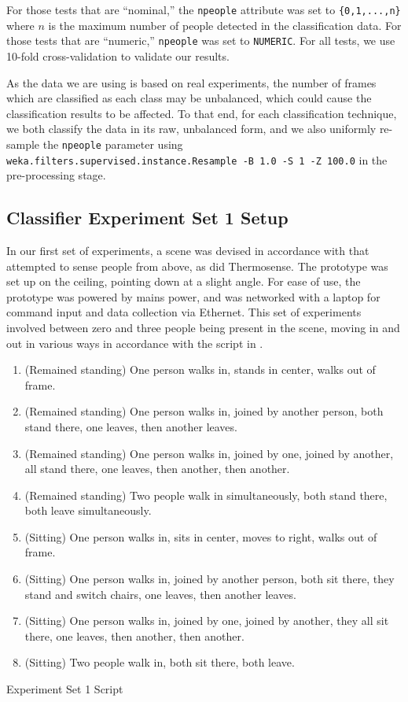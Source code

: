 \documentclass[../thesis/thesis.tex]{subfiles}
\begin{document}
For those tests that are ``nominal,'' the \texttt{npeople} attribute was set to \texttt{\{0,1,...,n\}} where $n$ is the maximum number of people detected in the classification data. For those tests that are ``numeric,'' \texttt{npeople} was set to \texttt{NUMERIC}. For all tests, we use 10-fold cross-validation to validate our results.

As the data we are using is based on real experiments, the number of frames which are classified as each class may be unbalanced, which could cause the classification results to be affected. To that end, for each classification technique, we both classify the data in its raw, unbalanced form, and we also uniformly re-sample the \texttt{npeople} parameter using \texttt{weka.filters.supervised.instance.Resample -B 1.0 -S 1 -Z 100.0} in the pre-processing stage.


\subsection{Classifier Experiment Set 1 Setup}
In our first set of experiments, a scene was devised in accordance with  that attempted to sense people from above, as did Thermosense. The prototype was set up on the ceiling, pointing down at a slight angle. For ease of use, the prototype was powered by mains power, and was networked with a laptop for command input and data collection via Ethernet. This set of experiments involved between zero and three people being present in the scene, moving in and out in various ways in accordance with the script in .

\begin{table}
\centering
\begin{enumerate}
\item (Remained standing) One person walks in, stands in center, walks out of frame.
\item (Remained standing) One person walks in, joined by another person, both stand there, one leaves, then another leaves.
\item (Remained standing) One person walks in, joined by one, joined by another, all stand there, one leaves, then another, then another.
\item (Remained standing) Two people walk in simultaneously, both stand there, both leave simultaneously.
\item (Sitting) One person walks in, sits in center, moves to right, walks out of frame.
\item (Sitting) One person walks in, joined by another person, both sit there, they stand and switch chairs, one leaves, then another leaves.
\item (Sitting) One person walks in, joined by one, joined by another, they all sit there, one leaves, then another, then another.
\item (Sitting) Two people walk in, both sit there, both leave.
\end{enumerate}
\caption{Experiment Set 1 Script}
\label{tab:exps:3script}
\end{table}
\end{document}
